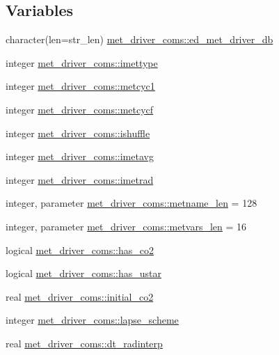 \subsection*{Variables}
\begin{DoxyCompactItemize}
\item 
character(len=str\+\_\+len) \hyperlink{namespacemet__driver__coms_a6d4b4339194ba7e2d390472721730670}{met\+\_\+driver\+\_\+coms\+::ed\+\_\+met\+\_\+driver\+\_\+db}
\item 
integer \hyperlink{namespacemet__driver__coms_af5accdb5c0675336f8ddabee3bace10d}{met\+\_\+driver\+\_\+coms\+::imettype}
\item 
integer \hyperlink{namespacemet__driver__coms_a1bdb4a13bac006468d76ccc158d7d3e1}{met\+\_\+driver\+\_\+coms\+::metcyc1}
\item 
integer \hyperlink{namespacemet__driver__coms_a9a06bc94d2fbf01d6d9ef295ba9f3887}{met\+\_\+driver\+\_\+coms\+::metcycf}
\item 
integer \hyperlink{namespacemet__driver__coms_a2ce26de7e6f46dc8cd0da3bfe754ee30}{met\+\_\+driver\+\_\+coms\+::ishuffle}
\item 
integer \hyperlink{namespacemet__driver__coms_a0660a4efaebadf28bdab54bf9951a37a}{met\+\_\+driver\+\_\+coms\+::imetavg}
\item 
integer \hyperlink{namespacemet__driver__coms_ab7529fe9e7b6343182886ee340c1e7a2}{met\+\_\+driver\+\_\+coms\+::imetrad}
\item 
integer, parameter \hyperlink{namespacemet__driver__coms_a8dc2e2ece34bf7b8bd355e602f477c66}{met\+\_\+driver\+\_\+coms\+::metname\+\_\+len} = 128
\item 
integer, parameter \hyperlink{namespacemet__driver__coms_af6adda2378b0db677d6ea2016d8cf4b3}{met\+\_\+driver\+\_\+coms\+::metvars\+\_\+len} = 16
\item 
logical \hyperlink{namespacemet__driver__coms_a2e3ba81bddf15bc81564998b3b1ca34d}{met\+\_\+driver\+\_\+coms\+::has\+\_\+co2}
\item 
logical \hyperlink{namespacemet__driver__coms_adda4be70af136683fcaaf3a8db47aff6}{met\+\_\+driver\+\_\+coms\+::has\+\_\+ustar}
\item 
real \hyperlink{namespacemet__driver__coms_a7c852a1288bd8e6ada039b1272bb2dee}{met\+\_\+driver\+\_\+coms\+::initial\+\_\+co2}
\item 
integer \hyperlink{namespacemet__driver__coms_ae37a372059ee47809fc1211fac945fd9}{met\+\_\+driver\+\_\+coms\+::lapse\+\_\+scheme}
\item 
real \hyperlink{namespacemet__driver__coms_a7fbebdfb60d0f28a7a8bb5985b016015}{met\+\_\+driver\+\_\+coms\+::dt\+\_\+radinterp}

\end{DoxyCompactItemize}
